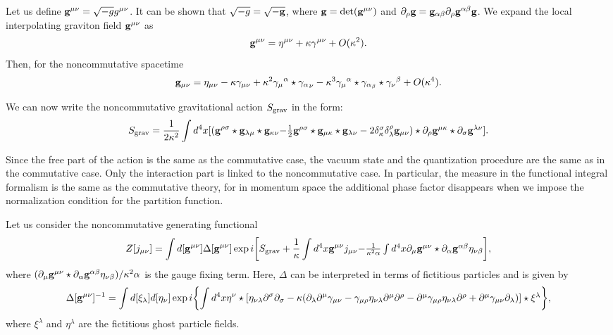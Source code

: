 \documentclass[a4paper,10pt]{article}
\begin{document}
Let us define ${\bf g}^{\mu\nu}=\sqrt{-g}g^{\mu\nu}$.
It can be shown that $\sqrt{-g}=\sqrt{-{\bf g}}$, where ${\bf g}=
{\rm det}({\bf g}^{\mu\nu})$ and $\partial_\rho{\bf g}={\bf
g}_{\alpha\beta}\partial_\rho{\bf g}^{\alpha\beta}{\bf g}$.
We expand the local interpolating graviton field ${\bf g}^{\mu\nu}$ as
\begin{equation}
{\bf g}^{\mu\nu}=\eta^{\mu\nu}+\kappa\gamma^{\mu\nu}+O(\kappa^2).
\end{equation}
Then, for the noncommutative spacetime
\begin{equation}
{\bf g}_{\mu\nu}=\eta_{\mu\nu}-\kappa\gamma_{\mu\nu}
+\kappa^2{\gamma_\mu}^\alpha\star{\gamma_\alpha}_\nu-\kappa^3{\gamma_\mu}^\alpha
\star\gamma_{\alpha_\beta}\star{\gamma_\nu}^\beta+O(\kappa^4).
\end{equation}

We can now write the noncommutative gravitational action $S_{\rm grav}$ in
the form:
\begin{equation}
\label{action}
S_{\rm grav}=\frac{1}{2\kappa^2}\int
d^4x [({\bf g}^{\rho\sigma}\star{\bf g}_{\lambda\mu}\star{\bf g}_{\kappa\nu}
$$ $$
-\frac{1}{2}{\bf g}^{\rho\sigma}
\star{\bf g}_{\mu\kappa}\star{\bf g}_{\lambda\nu}
-2\delta^\sigma_\kappa\delta^\rho_\lambda{\bf
g}_{\mu\nu})\star\partial_\rho{\bf g}^{\mu\kappa}\star\partial_\sigma{\bf
g}^{\lambda\nu}].
\end{equation}

Since the free part of the action is the same as the commutative case, the vacuum
state and the quantization procedure are the same as in the commutative case. Only
the interaction part is linked to the noncommutative case. In particular, the measure
in the functional integral formalism is the same as the commutative theory, for in
momentum space the additional phase factor disappears when we impose the
normalization condition for the partition function.

Let us consider the noncommutative generating
functional~\cite{Fradkin,Leibbrandt,Medrano}
\begin{equation}
Z[j_{\mu\nu}]=\int
d[{\bf g}^{\mu\nu}]\Delta[{\bf g}^{\mu\nu}] \exp i\biggl[S_{\rm
grav}+\frac{1}{\kappa}\int d^4x{\bf g}^{\mu\nu}j_{\mu\nu} $$ $$
-\frac{1}{\kappa^2\alpha}\int d^4x\partial_\mu{\bf g}^{\mu\nu}
\star\partial_\alpha{\bf g}^{\alpha\beta}\eta_{\nu\beta}\biggr],
\end{equation}
where
$(\partial_\mu{\bf g}^{\mu\nu}\star\partial_\alpha{\bf
g}^{\alpha\beta}\eta_{\nu\beta}) /\kappa^2\alpha$ is the gauge fixing term.
Here, $\Delta$ can be interpreted in terms of fictitious particles and is
given by \begin{equation} \Delta[{\bf g}^{\mu\nu}]^{-1} =\int
d[\xi_\lambda]d[\eta_\nu]\exp i\biggl\{\int
d^4x\eta^\nu\star[\eta_{\nu\lambda}
\partial^\sigma\partial_\sigma-\kappa(\partial_\lambda\partial^\mu\gamma_{\mu\nu}-\gamma_{\mu\rho}
$$ $$
\eta_{\nu\lambda}\partial^\mu\partial^\rho-\partial^\mu\gamma_{\mu\rho}\eta_{\nu\lambda}
\partial^\rho+\partial^\mu\gamma_{\mu\nu}\partial_\lambda)]\star\xi^\lambda\biggr\},
\end{equation}
where $\xi^\lambda$ and $\eta^\lambda$ are the fictitious ghost particle fields.
\end{document}
